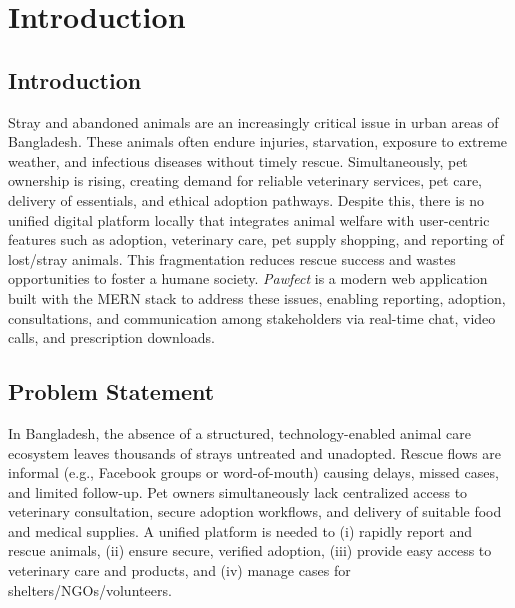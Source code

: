 \documentclass[12pt,a4paper]{report}
\numberwithin{figure}{chapter}
\numberwithin{table}{chapter}
\begin{document}
\tableofcontents
\listoftables
\listoffigures

\clearpage
{}

\chapter{Introduction}

\section{Introduction}
Stray and abandoned animals are an increasingly critical issue in urban areas of Bangladesh. These animals often endure injuries, starvation, exposure to extreme weather, and infectious diseases without timely rescue. Simultaneously, pet ownership is rising, creating demand for reliable veterinary services, pet care, delivery of essentials, and ethical adoption pathways. Despite this, there is no unified digital platform locally that integrates animal welfare with user-centric features such as adoption, veterinary care, pet supply shopping, and reporting of lost/stray animals. This fragmentation reduces rescue success and wastes opportunities to foster a humane society. \textit{Pawfect} is a modern web application built with the MERN stack to address these issues, enabling reporting, adoption, consultations, and communication among stakeholders via real-time chat, video calls, and prescription downloads.

\section{Problem Statement}
In Bangladesh, the absence of a structured, technology-enabled animal care ecosystem leaves thousands of strays untreated and unadopted. Rescue flows are informal (e.g., Facebook groups or word-of-mouth) causing delays, missed cases, and limited follow-up. Pet owners simultaneously lack centralized access to veterinary consultation, secure adoption workflows, and delivery of suitable food and medical supplies. A unified platform is needed to (i) rapidly report and rescue animals, (ii) ensure secure, verified adoption, (iii) provide easy access to veterinary care and products, and (iv) manage cases for shelters/NGOs/volunteers.
\end{document}
